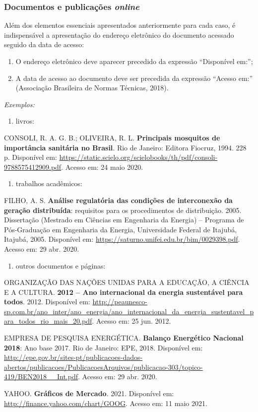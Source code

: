 \documentclass[10pt,a4paper]{article}
\newenvironment{referencias}
  {\begin{list}{}{\setlength{\leftmargin}{2.2em}\setlength{\itemsep}{\baselineskip}
     \setlength{\parsep}{0pt}\setlength{\topsep}{4pt}}
   \singlespacing\raggedright\sloppy}
  {\end{list}}
\newcommand{\referencia}{\item[]}
\newcommand{\exemplos}{\item[]{\itshape Exemplos:}\vspace{-\baselineskip}}
\begin{document}
\subsubsection*{Documentos e publicações \textit{online}}
Além dos elementos essenciais apresentados anteriormente para cada caso, é indispensável a apresentação do endereço eletrônico do documento acessado seguido da data de acesso:
\begin{enumerate}
  \item O endereço eletrônico deve aparecer precedido da expressão ``Disponível em:'';
  \item A data de acesso ao documento deve ser precedida da expressão ``Acesso em:'' (Associação Brasileira de Normas Técnicas, 2018).
\end{enumerate}
\begin{referencias}
  \exemplos
\end{referencias}
\begin{enumerate}
  \item livros:
\end{enumerate}
\begin{referencias}
  \referencia CONSOLI, R. A. G. B.; OLIVEIRA, R. L. \textbf{Principais mosquitos de importância sanitária no Brasil}. Rio de Janeiro: Editora Fiocruz, 1994. 228 p. Disponível em: \url{https://static.scielo.org/scielobooks/th/pdf/consoli-9788575412909.pdf}. Acesso em: 24 maio 2020.
\end{referencias}
\begin{enumerate}[resume]
  \item trabalhos acadêmicos:
\end{enumerate}
\begin{referencias}
  \referencia FILHO, A. S. \textbf{Análise regulatória das condições de interconexão da geração distribuída}: requisitos para os procedimentos de distribuição. 2005. Dissertação (Mestrado em Ciências em Engenharia da Energia) -- Programa de Pós-Graduação em Engenharia da Energia, Universidade Federal de Itajubá, Itajubá, 2005. Disponível em: \url{https://saturno.unifei.edu.br/bim/0029398.pdf}. Acesso em: 29 abr. 2020.
\end{referencias}
\begin{enumerate}[resume]
  \item outros documentos e páginas:
\end{enumerate}
\begin{referencias}
  \referencia ORGANIZAÇÃO DAS NAÇÕES UNIDAS PARA A EDUCAÇÃO, A CIÊNCIA E A CULTURA. \textbf{2012 -- Ano internacional da energia sustentável para todos}. 2012. Disponível em: \url{http://peaunesco-sp.com.br/ano_inter/ano_energia/ano_internacional_da_energia_sustentavel_para_todos_rio_mais_20.pdf}. Acesso em: 25 jun. 2012.
  \referencia EMPRESA DE PESQUISA ENERGÉTICA. \textbf{Balanço Energético Nacional 2018}: Ano base 2017. Rio de Janeiro: EPE, 2018. Disponível em: \url{http://epe.gov.br/sites-pt/publicacoes-dados-abertos/publicacoes/PublicacoesArquivos/publicacao-303/topico-419/BEN2018__Int.pdf}. Acesso em: 29 abr. 2020.
  \referencia YAHOO. \textbf{Gráficos de Mercado}. 2021. Disponível em: \url{http://finance.yahoo.com/chart/GOOG}. Acesso em: 11 maio 2021.
\end{referencias}
\end{document}
